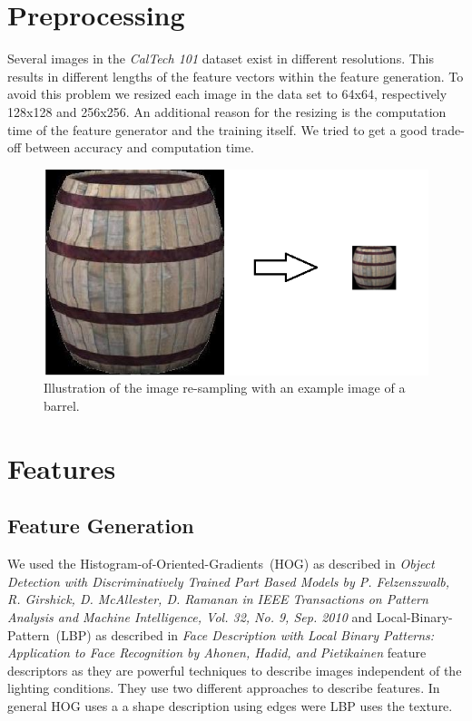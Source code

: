 \documentclass[a4paper,10pt]{article}
\begin{document}
\section{Preprocessing}
\label{sec:preprocessing}
Several images in the \emph{CalTech 101} dataset exist in different resolutions. 
This results in different lengths of the feature vectors within the feature generation.
To avoid this problem we resized each image in the data set to 64x64, respectively 128x128 and 256x256.
An additional reason for the resizing is the computation time of the feature generator and the training itself. 
We tried to get a good trade-off between accuracy and computation time.
\begin{figure}[ht]
\centering
\includegraphics[scale=0.5]{images/preprocessing.png}
\caption{Illustration of the image re-sampling with an example image of a barrel.}
\label{fig:resize}
\end{figure}

\section{Features}
\subsection{Feature Generation}

We used the Histogram-of-Oriented-Gradients~(HOG) as described in \emph{Object Detection with Discriminatively Trained Part Based Models by P. Felzenszwalb, R. Girshick, D. McAllester, D. Ramanan in IEEE Transactions on Pattern Analysis and Machine Intelligence, Vol. 32, No. 9, Sep. 2010}
and Local-Binary-Pattern~(LBP) as described in \emph{Face Description with Local Binary Patterns: Application to Face Recognition by Ahonen, Hadid, and Pietikainen}
feature descriptors as they are powerful techniques to describe images independent of the lighting conditions.
They use two different approaches to describe features. In general HOG uses a a shape description using edges were LBP uses the texture.
\end{document}

